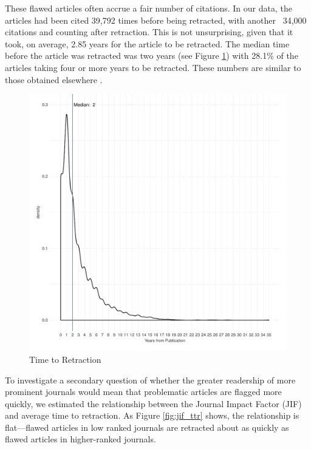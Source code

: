 \documentclass[12pt, letterpaper]{article}
\begin{document}
These flawed articles often accrue a fair number of citations. In our data, the articles had been cited 39,792 times before being retracted, with another ~34,000 citations and counting after retraction. This is not unsurprising, given that it took, on average, 2.85 years for the article to be retracted. The median time before the article was retracted was two years (see Figure \ref{fig:ttr}) with 28.1\% of the articles taking four or more years to be retracted. These numbers are similar to those obtained elsewhere \citep[e.g.,][]{steen2013has}.

\begin{figure}[H]
\centering
\includegraphics[scale=.7]{../figs/time_to_retraction.pdf}
\caption{Time to Retraction}
\label{fig:ttr}
\end{figure}

To investigate a secondary question of whether the greater readership of more prominent journals would mean that problematic articles are flagged more quickly, we estimated the relationship between the Journal Impact Factor (JIF) and average time to retraction. As Figure \ref{fig:jif_ttr} shows, the relationship is flat---flawed articles in low ranked journals are retracted about as quickly as flawed articles in higher-ranked journals.
\end{document}
